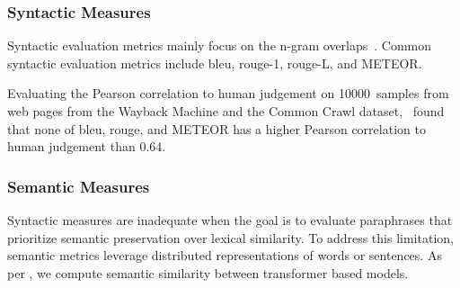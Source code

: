

\subsubsection{Syntactic Measures}
Syntactic evaluation metrics mainly focus on the n-gram overlaps~\citep{zhou_paraphrase_2021}. 
Common syntactic evaluation metrics include \acs{bleu}, \acs{rouge}-1, \acs{rouge}-L, and METEOR.





Evaluating the Pearson correlation to human judgement on \num{10000}~samples from web pages from the Wayback Machine and the Common Crawl dataset, \citet{anantha_pearson_metrics_2021}\ found that none of \ac{bleu}, \ac{rouge}, and METEOR has a higher Pearson correlation to human judgement than $0.64$.


\subsubsection{Semantic Measures}
Syntactic measures are inadequate when the goal is to evaluate paraphrases that prioritize semantic preservation over lexical similarity. 
To address this limitation, semantic metrics leverage distributed representations of words or sentences.
As per \citet{gohsen_captions_2023}, we compute semantic similarity between transformer based models.

